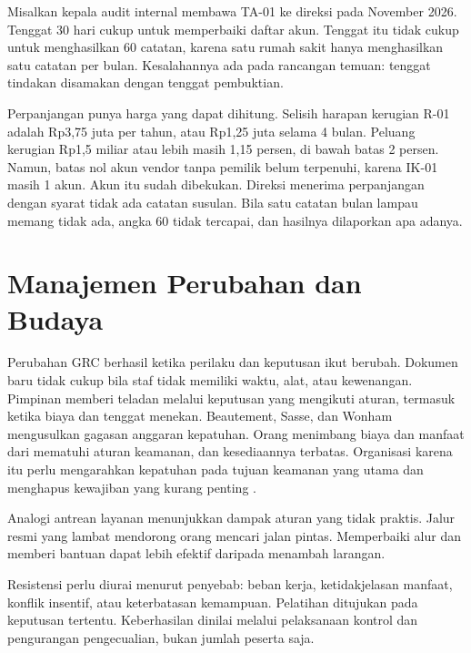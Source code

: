\begin{kasus}[title={Kasus Medikara Health: Mengapa Tenggat 30 Hari Terlalu Pendek}]
Misalkan kepala audit internal membawa TA-01 ke direksi pada November 2026. Tenggat 30 hari cukup
untuk memperbaiki daftar akun. Tenggat itu tidak cukup untuk menghasilkan 60 catatan, karena satu
rumah sakit hanya menghasilkan satu catatan per bulan. Kesalahannya ada pada rancangan temuan:
tenggat tindakan disamakan dengan tenggat pembuktian.

Perpanjangan punya harga yang dapat dihitung. Selisih harapan kerugian R-01 adalah Rp3,75 juta per
tahun, atau Rp1,25 juta selama 4 bulan. Peluang kerugian Rp1,5 miliar atau lebih masih 1,15 persen,
di bawah batas 2 persen. Namun, batas nol akun vendor tanpa pemilik belum terpenuhi, karena IK-01
masih 1 akun. Akun itu sudah dibekukan. Direksi menerima perpanjangan dengan syarat tidak ada
catatan susulan. Bila satu catatan bulan lampau memang tidak ada, angka 60 tidak tercapai, dan
hasilnya dilaporkan apa adanya.
\end{kasus}

\section{Manajemen Perubahan dan Budaya}

Perubahan GRC berhasil ketika perilaku dan keputusan ikut berubah. Dokumen baru tidak cukup bila
staf tidak memiliki waktu, alat, atau kewenangan. Pimpinan memberi teladan melalui keputusan yang
mengikuti aturan, termasuk ketika biaya dan tenggat menekan. Beautement, Sasse, dan Wonham
mengusulkan gagasan anggaran kepatuhan. Orang menimbang biaya dan manfaat dari mematuhi aturan
keamanan, dan kesediaannya terbatas. Organisasi karena itu perlu mengarahkan kepatuhan pada tujuan
keamanan yang utama dan menghapus kewajiban yang kurang penting \cite{c14-beautement2008}.

Analogi antrean layanan menunjukkan dampak aturan yang tidak praktis. Jalur resmi yang lambat
mendorong orang mencari jalan pintas. Memperbaiki alur dan memberi bantuan dapat lebih efektif
daripada menambah larangan.

Resistensi perlu diurai menurut penyebab: beban kerja, ketidakjelasan manfaat, konflik insentif,
atau keterbatasan kemampuan. Pelatihan ditujukan pada keputusan tertentu. Keberhasilan dinilai
melalui pelaksanaan kontrol dan pengurangan pengecualian, bukan jumlah peserta saja.

